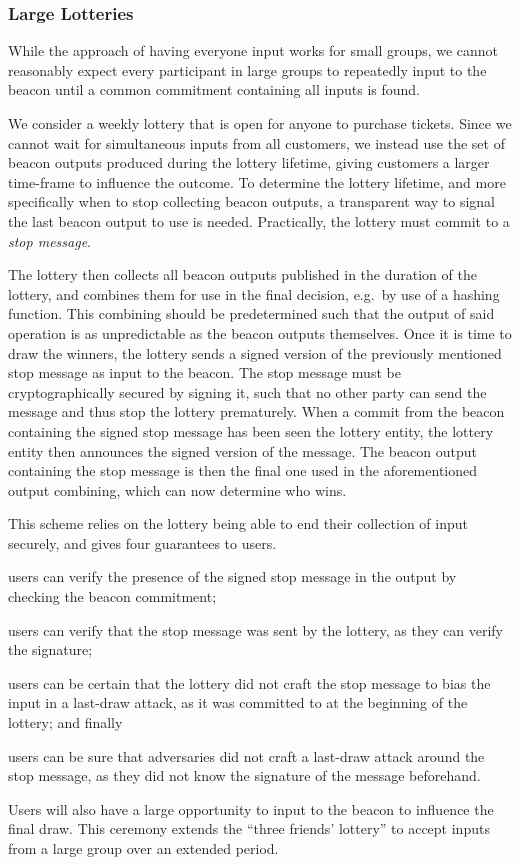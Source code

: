 \subsubsection{Large Lotteries}%
\label{ssub:large_lotteries}
While the approach of having everyone input works for small groups, we cannot reasonably expect every participant in large groups to repeatedly input to the beacon until a common commitment containing all inputs is found.

We consider a weekly lottery that is open for anyone to purchase tickets.
Since we cannot wait for simultaneous inputs from all customers, we instead use the set of beacon outputs produced during the lottery lifetime, giving customers a larger time-frame to influence the outcome.
To determine the lottery lifetime, and more specifically when to stop collecting beacon outputs, a transparent way to signal the last beacon output to use is needed.
Practically, the lottery must commit to a \textit{stop message}.

The lottery then collects all beacon outputs published in the duration of the lottery, and combines them for use in the final decision, e.g.\ by use of a hashing function.
This combining should be predetermined such that the output of said operation is as unpredictable as the beacon outputs themselves.
Once it is time to draw the winners, the lottery sends a signed version of the previously mentioned stop message as input to the beacon.
The stop message must be cryptographically secured by signing it, such that no other party can send the message and thus stop the lottery prematurely.
When a commit from the beacon containing the signed stop message has been seen the lottery entity, the lottery entity then announces the signed version of the message.
The beacon output containing the stop message is then the final one used in the aforementioned output combining, which can now determine who wins.

This scheme relies on the lottery being able to end their collection of input securely, and gives four guarantees to users.
\begin{enumberate*}
\item users can verify the presence of the signed stop message in the output by checking the beacon commitment;
\item users can verify that the stop message was sent by the lottery, as they can verify the signature;
\item users can be certain that the lottery did not craft the stop message to bias the input in a last-draw attack, as it was committed to at the beginning of the lottery; and finally
\item users can be sure that adversaries did not craft a last-draw attack around the stop message, as they did not know the signature of the message beforehand.
\end{enumberate*}

Users will also have a large opportunity to input to the beacon to influence the final draw.
This ceremony extends the \enquote{three friends' lottery} to accept inputs from a large group over an extended period.

